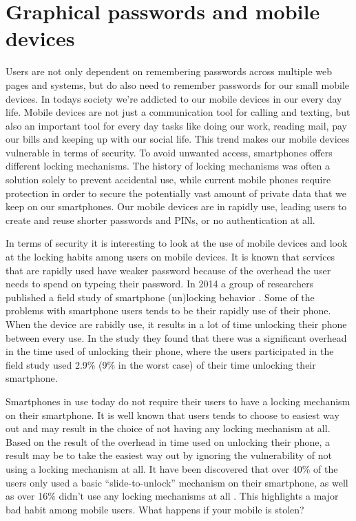 \section{Graphical passwords and mobile devices}
  Users are not only dependent on remembering passwords across multiple web pages and systems, but do also need to remember passwords for our small mobile devices. In todays society we're addicted to our mobile devices in our every day life. Mobile devices are not just a communication tool for calling and texting, but also an important tool for every day tasks like doing our work, reading mail, pay our bills and keeping up with our social life. This trend makes our mobile devices vulnerable in terms of security. To avoid unwanted access, smartphones offers different locking mechanisms. The history of locking mechanisms was often a solution solely to prevent accidental use, while current mobile phones require protection in order to secure the potentially vast amount of private data that we keep on our smartphones. Our mobile devices are in rapidly use, leading users to create and reuse shorter passwords and PINs, or no authentication at all. 

  In terms of security it is interesting to look at the use of mobile devices and look at the locking habits among users on mobile devices. It is known that services that are rapidly used have weaker password because of the overhead the user needs to spend on typeing their password. In 2014 a group of researchers published a field study of smartphone (un)locking behavior \cite{habits3}. Some of the problems with smartphone users tends to be their rapidly use of their phone. When the device are rabidly use, it results in a lot of time unlocking their phone between every use. In the study they found that there was a significant overhead in the time used of unlocking their phone, where the users participated in the field study used 2.9\% (9\% in the worst case) of their time unlocking their smartphone. 
  
  Smartphones in use today do not require their users to have a locking mechanism on their smartphone. It is well known that users tends to choose to easiest way out and may result in the choice of not having any locking mechanism at all. Based on the result of the overhead in time used on unlocking their phone, a result may be to take the easiest way out by ignoring the vulnerability of not using a locking mechanism at all. It have been discovered that over 40\% of the users only used a basic ``slide-to-unlock'' mechanism on their smartphone, as well as over 16\% didn't use any locking mechanisms at all \cite{habits3}. This highlights a major bad habit among mobile users. What happens if your mobile is stolen? 

